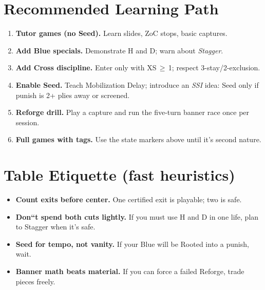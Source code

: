 \documentclass[11pt]{article}
\begin{document}
\section*{Recommended Learning Path}
\begin{enumerate}[label=\arabic*)]
  \item \textbf{Tutor games (no Seed).} Learn slides, ZoC stops, basic captures.
  \item \textbf{Add Blue specials.} Demonstrate H and D; warn about \emph{Stagger}.
  \item \textbf{Add Cross discipline.} Enter only with XS\,$\ge$\,1; respect 3-stay/2-exclusion.
  \item \textbf{Enable Seed.} Teach Mobilization Delay; introduce an \emph{SSI} idea: Seed only if punish is 2+ plies away or screened.
  \item \textbf{Reforge drill.} Play a capture and run the five-turn banner race once per session.
  \item \textbf{Full games with tags.} Use the state markers above until it's second nature.
\end{enumerate}

\section*{Table Etiquette (fast heuristics)}
\begin{itemize}
  \item \textbf{Count exits before center.} One certified exit is playable; two is safe.
  \item \textbf{Don``t spend both cuts lightly.} If you must use H and D in one life, plan to Stagger when it's safe.
  \item \textbf{Seed for tempo, not vanity.} If your Blue will be Rooted into a punish, wait.
  \item \textbf{Banner math beats material.} If you can force a failed Reforge, trade pieces freely.
\end{itemize}


\end{document}
